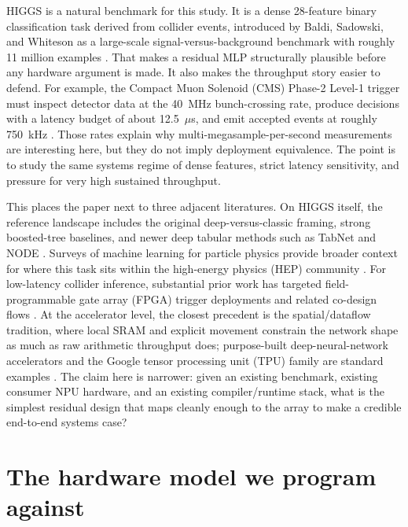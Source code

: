 \documentclass[a4paper,11pt]{article}
\begin{document}
HIGGS is a natural benchmark for this study. It is a dense 28-feature binary
classification task derived from collider events, introduced by Baldi,
Sadowski, and Whiteson as a large-scale signal-versus-background benchmark with
roughly 11 million examples \cite{baldi-higgs,uci-higgs}. That makes a residual
MLP structurally plausible before any hardware argument is made. It also makes
the throughput story easier to defend. For example, the Compact Muon Solenoid
(CMS) Phase-2 Level-1 trigger must inspect detector data at the 40~MHz
bunch-crossing rate, produce decisions with a latency budget of about
12.5~$\mu$s, and emit accepted events at roughly 750~kHz
\cite{cms-phase2-l1}. Those rates explain why multi-megasample-per-second
measurements are interesting here, but they do not imply deployment
equivalence. The point is to study the same systems regime of dense features,
strict latency sensitivity, and pressure for very high sustained throughput.

This places the paper next to three adjacent literatures. On HIGGS itself, the
reference landscape includes the original deep-versus-classic framing, strong
boosted-tree baselines, and newer deep tabular methods such as TabNet and NODE
\cite{baldi-higgs,xgboost-kdd,lightgbm-nips,catboost-paper,rtdl-revisiting,grinsztajn-tabular,tabnet,node-paper}. Surveys of machine learning for particle physics provide broader context for where this task sits within the high-energy physics (HEP) community \cite{ml4hep-review}. For low-latency collider inference, substantial prior work has targeted field-programmable gate array (FPGA) trigger deployments and related co-design flows \cite{duarte-fpga,hls4ml,cms-phase2-l1}. At the accelerator level, the closest precedent is the spatial/dataflow tradition, where local SRAM and explicit movement constrain the network shape as much as raw arithmetic throughput does; purpose-built deep-neural-network accelerators and the Google tensor processing unit (TPU) family are standard examples \cite{dadiannao,eyeriss,tpu-isca17}. The claim here is narrower: given an existing benchmark, existing consumer NPU hardware, and an existing compiler/runtime stack, what is the simplest residual design that maps cleanly enough to the array to make a credible end-to-end systems case?

\section{The hardware model we program against}
\end{document}

